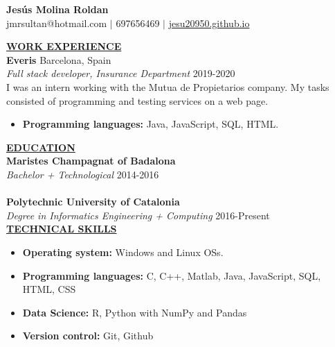 \documentclass{article}
\begin{document}
	\begin{center}
		\thispagestyle{empty}
		\large \textbf{Jesús Molina Roldan\\}
		\normalsize jmr\textunderscore sultan@hotmail.com $\mid$ 697656469 $\mid$ \href{https://jesu20950.github.io/}{jesu20950.github.io} \\ 
		\hrulefill
	\end{center}
	
	\noindent \textbf{\underline{WORK EXPERIENCE}} \\
	\noindent \textbf{Everis} \hfill Barcelona, Spain \\
	\textit{Full stack developer, Insurance Department} \hfill 2019-2020 \\
	I was an intern working with the Mutua de Propietarios company. My tasks consisted of programming and testing services on a web page.
	\begin{itemize}[noitemsep,nolistsep,leftmargin=*]
		\item {\textbf{Programming languages:} Java, JavaScript, SQL, HTML.}\\
	\end{itemize}
	

	\noindent \textbf{\underline{EDUCATION}} \\
	\textbf{Maristes Champagnat of Badalona} \\
	\textit{Bachelor + Technological}  \hfill 2014-2016  \\ \\
	\textbf{Polytechnic University of Catalonia} \\
	\textit{Degree in Informatics Engineering + Computing}  \hfill 2016-Present \\
	

	\noindent \textbf{\underline{TECHNICAL SKILLS}} \\
	\begin{itemize}[noitemsep,nolistsep,leftmargin=*]
		\item {\textbf{Operating system:} Windows and Linux OSs.}
		\item {\textbf{Programming languages:} C, C++, Matlab, Java, JavaScript, SQL, HTML, CSS}
		\item {\textbf{Data Science:} R, Python with NumPy and Pandas}
		\item {\textbf{Version control:} Git, Github}\\
	\end{itemize}
	
\end{document}
